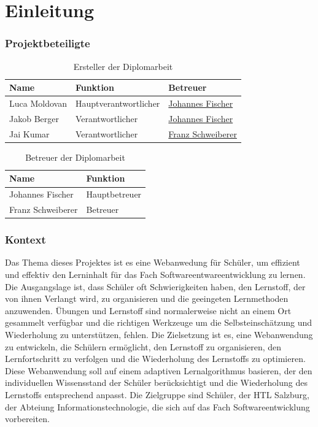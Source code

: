 \chapter*{Einleitung}
\label{chap:Einleitung}
\subsection{Projektbeteiligte}
\begin{table}[htbp]
	\centering
	\caption{Ersteller der Diplomarbeit}
	\label{tab:ersteller}
	\begin{tabular}{lll}
		\toprule
		Name & Funktion & Betreuer \\
		\midrule
		Luca Moldovan & Hauptverantwortlicher &  \hyperref[tab:betreuer]{Johannes Fischer}\\
		Jakob Berger & Verantwortlicher &  \hyperref[tab:betreuer]{Johannes Fischer} \\
		Jai Kumar & Verantwortlicher &  \hyperref[tab:betreuer]{Franz Schweiberer} \\
		\bottomrule
	\end{tabular}
\end{table}

\begin{table}[htbp]
	\centering
	\caption{Betreuer der Diplomarbeit}
	\label{tab:betreuer}
	\begin{tabular}{ll}
		\toprule
		Name & Funktion\\
		\midrule
		Johannes Fischer & Hauptbetreuer \\
        Franz Schweiberer & Betreuer \\
		\bottomrule
	\end{tabular}
\end{table}
\subsection{Kontext}
Das Thema dieses Projektes ist es eine Webanwedung für Schüler, um effizient und effektiv den Lerninhalt für das Fach Softwareentwareentwicklung zu lernen.
Die Ausgangslage ist, dass Schüler oft Schwierigkeiten haben, den Lernstoff, der von ihnen Verlangt wird, zu organisieren und die geeingeten Lernmethoden anzuwenden. 
Übungen und Lernstoff sind normalerweise nicht an einem Ort gesammelt verfügbar und die richtigen Werkzeuge um die Selbsteinschätzung und Wiederholung zu unterstützen, fehlen.
Die Zielsetzung ist es, eine Webanwendung zu entwickeln, die Schülern ermöglicht, den Lernstoff zu organisieren, den Lernfortschritt zu verfolgen und die Wiederholung des Lernstoffs zu optimieren.
Diese Webanwendung soll auf einem adaptiven Lernalgorithmus basieren, der den individuellen Wissensstand der Schüler berücksichtigt und die Wiederholung des Lernstoffs entsprechend anpasst.
Die Zielgruppe sind Schüler, der HTL Salzburg, der Abteiung Informationstechnologie, die sich auf das Fach Softwareentwicklung vorbereiten.

